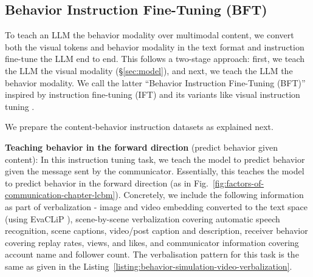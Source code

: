 





\subsection{Behavior Instruction Fine-Tuning (BFT)}
\label{sec:behavior-instruction-tuning}
To teach an LLM the behavior modality over multimodal content, we convert both the visual tokens and behavior modality in the text format and instruction fine-tune the LLM end to end. This follows a two-stage approach: first, we teach the LLM the visual modality (\S\ref{sec:model}), and next, we teach the LLM the behavior modality. We call the latter ``Behavior Instruction Fine-Tuning (BFT)'' inspired by instruction fine-tuning (IFT) and its variants like visual instruction tuning \cite{liu2023visual}.




We prepare the content-behavior instruction datasets as explained next.

\textbf{Teaching behavior in the forward direction} (predict behavior given content): In this instruction tuning task, we teach the model to predict behavior given the message sent by the communicator. Essentially, this teaches the model to predict behavior in the forward direction (as in Fig.~\ref{fig:factors-of-communication-chapter-lcbm}). Concretely, we include the following information as part of verbalization - image and video embedding converted to the text space (using EvaCLiP \cite{sun2023eva}), scene-by-scene verbalization covering automatic speech recognition, scene captions, video/post caption and description, receiver behavior covering replay rates, views, and likes, and communicator information covering account name and follower count. The verbalisation pattern for this task is the same as given in the Listing~\ref{listing:behavior-simulation-video-verbalization}.

